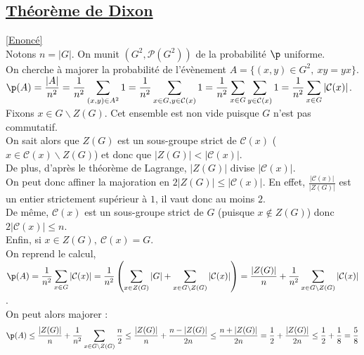 \documentclass[8pt]{book}
\begin{document}
	\subsection{\underline{Théorème de Dixon} }
	\label{Probabilité que deux éléments d'un groupe commutent corrigé}
	\textcolor{blue}{\hyperref[Probabilité que deux élémebts d'un groupe commutent]{[Enoncé]}}\\
	Notons $n=|G|$. On munit $(G^2,\mathcal{P}(G^2))$ de la probabilité $\p$ uniforme.\\
	On cherche à majorer la probabilité de l'évènement $A=\{(x,y)\in G^2,\ xy=yx\}$.\\
	$\p(A)=\displaystyle\frac{|A|}{n^2}=\frac{1}{n^2}\sum\limits_{(x,y)\in A^2}1=\frac{1}{n^2}\sum\limits_{x\in G,y\in \mathcal{C}(x)}1=\frac{1}{n^2}\sum\limits_{x\in G}\sum\limits_{y\in \mathcal{C}(x)}1=\frac{1}{n^2}\sum\limits_{x\in G}|\mathcal{C}(x)|$.\\
	Fixons $x\in G\backslash Z(G)$. Cet ensemble est non vide puisque $G$ n'est pas commutatif.\\
	On sait alors que $Z(G)$ est un sous-groupe strict de $\mathcal{C}(x)$ ($x\in \mathcal{C}(x)\backslash Z(G)$) et donc que $|Z(G)|<|\mathcal{C}(x)|$.\\
	De plus, d'après le théorème de Lagrange, $|Z(G)|$ divise $|\mathcal{C}(x)|$.\\
	On peut donc affiner la majoration en $2|Z(G)|\leq |\mathcal{C}(x)|$. En effet, $\displaystyle\frac{|\mathcal{C}(x)|}{|Z(G)|}$ est un entier strictement supérieur à $1$, il vaut donc au moins $2$.\\
	De même, $\mathcal{C}(x)$ est un sous-groupe strict de $G$ (puisque $x\notin Z(G)$) donc $2|\mathcal{C}(x)|\leq n$.\\
	Enfin, si $x\in Z(G),\ \mathcal{C}(x)=G$.\\
	On reprend le calcul,\\
	$\p(A)=\displaystyle\frac{1}{n^2}\sum\limits_{x\in G}|\mathcal{C}(x)|=\frac{1}{n^2}\left(\sum\limits_{x\in Z(G)}|G|+\sum\limits_{x\in G\backslash Z(G)}|\mathcal{C}(x)|\right)=\frac{|Z(G)|}{n}+\frac{1}{n^2}\sum\limits_{x\in G\backslash Z(G)}|\mathcal{C}(x)|$.\\
	On peut alors majorer :
	$$\p(A)\leq \frac{|Z(G)|}{n}+\frac{1}{n^2}\sum\limits_{x\in G\backslash Z(G)}\frac{n}{2}\leq \frac{|Z(G)|}{n}+\frac{n-|Z(G)|}{2n}\leq\frac{n+|Z(G)|}{2n}=\frac{1}{2}+\frac{|Z(G)|}{2n}\leq \frac{1}{2}+\frac{1}{8}=\frac{5}{8}$$
	
\end{document}

